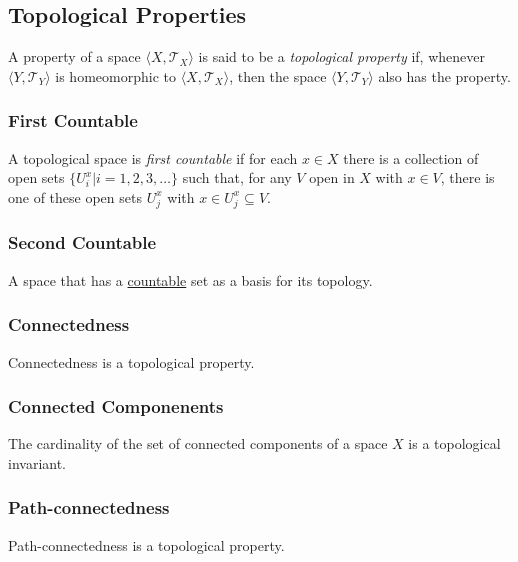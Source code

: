 \subsection{Topological Properties}\label{topologicalproperties}
A property of a space $\langle X,\mathcal{T}_X \rangle$ is said to be a \emph{topological property} if, whenever $\langle Y, \mathcal{T}_Y \rangle$ is homeomorphic to $\langle X,\mathcal{T}_X \rangle$, then the space $\langle Y,\mathcal{T}_Y \rangle$
also has the property.

\subsubsection{First Countable}\label{firstcountable}
A topological space is \emph{first countable} if for each $x \in X$ there is a collection of open sets $\{ U^x_i | i = 1,2,3,\dots \}$ such that,
for any $V$ open in $X$ with $x \in V$, there is one of these open sets $U^x_j$ with $x \in U^x_j \subseteq V$.

\subsubsection{Second Countable}\label{secondcountable}
A space that has a \hyperref[countable]{countable} set as a basis for its topology.

\subsubsection{Connectedness}
Connectedness is a topological property.

\subsubsection{Connected Componenents}
The cardinality of the set of connected components of a space $X$ is a topological invariant.

\subsubsection{Path-connectedness}
Path-connectedness is a topological property.